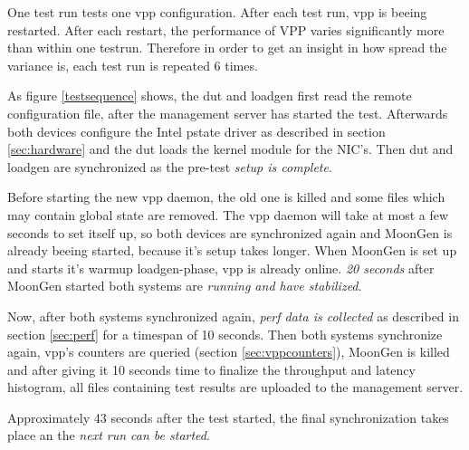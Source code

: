 One test run tests one vpp configuration. After each test run, vpp is
beeing restarted. After each restart, the performance of VPP varies
significantly more than within one testrun. Therefore in order to get
an insight in how spread the variance is, each test run is repeated 6
times. 

As figure \ref{testsequence} shows, the \Ac{dut} and \Ac{loadgen} first read the remote configuration file, after the management server has started the test. Afterwards both devices configure the Intel pstate driver  as described in section \ref{sec:hardware} and the \Ac{dut} loads the kernel module for the NIC's. Then \Ac{dut} and \Ac{loadgen} are synchronized as the pre-test \textit{setup is complete}. 

Before starting the new \Ac{vpp} daemon, the old one is killed and some files which may contain global state are removed. The \Ac{vpp} daemon will take at most a few seconds to set itself up, so both devices are synchronized again and MoonGen is already beeing started, because it's setup takes longer. When MoonGen is set up and starts it's warmup loadgen-phase, \Ac{vpp} is already online. \textit{20 seconds} after MoonGen started both systems are \textit{running and have stabilized}. 

Now, after both systems synchronized again, \textit{\Ac{perf} data is collected} as described in section \ref{sec:perf} for a timespan of 10 seconds. Then both systems synchronize again, \Ac{vpp}'s counters are queried (section \ref{sec:vppcounters}), MoonGen is killed and after giving it 10 seconds time to finalize the throughput and latency histogram, all files containing test results are uploaded to the management server. 

Approximately 43 seconds after the test started, the final synchronization takes place an the \textit{next run can be started}. 

